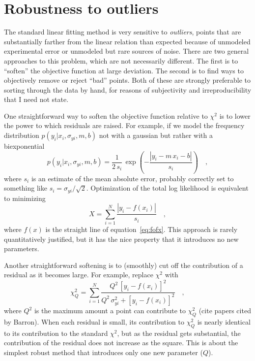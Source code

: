 \documentclass[12pt]{article}
\newcommand{\equationname}{equation}
\newcounter{problem}
\begin{document}
\section{Robustness to outliers}

The standard linear fitting method is very sensitive to
\emph{outliers}, points that are substantially farther from the linear
relation than expected because of unmodeled experimental error or
unmodeled but rare sources of noise.  There are two general approaches
to this problem, which are not necessarily different.  The first is to
``soften'' the objective function at large deviation.  The second is
to find ways to objectively remove or reject ``bad'' points.  Both of
these are strongly preferable to sorting through the data by hand, for
reasons of subjectivity and irreproducibility that I need not state.

One straightforward way to soften the objective function relative to
$\chi^2$ is to lower the power to which residuals are raised.  For
example, if we model the frequency distribution
$p(y_i|x_i,\sigma_{yi},m,b)$ not with a gaussian but rather with a
biexponential
\begin{equation}
p(y_i|x_i,\sigma_{yi},m,b) = \frac{1}{2\,s_i}
 \,\exp\left(-\frac{|y_i-m\,x_i-b|}{s_i}\right) \quad ,
\end{equation}
where $s_i$ is an estimate of the mean absolute error, probably
correctly set to something like $s_i = \sigma_{yi}/\sqrt{2}$.
Optimization of the total log likelihood is equivalent to minimizing
\begin{equation}\label{eq:biexp}
X = \sum_{i=1}^N \frac{|y_i-f(x_i)|}{s_i} \quad ,
\end{equation}
where $f(x)$ is the straight line of \equationname~\ref{eq:fofx}.
This approach is rarely quantitatively justified, but it has the nice
property that it introduces no new parameters.

Another straightforward softening is to (smoothly) cut off the
contribution of a residual as it becomes large.  For example, replace
$\chi^2$ with
\begin{equation}\label{eq:soft}
\chi_Q^2 = \sum_{i=1}^N \frac{Q^2\,[y_i-f(x_i)]^2}
  {Q^2\,\sigma_{yi}^2+[y_i-f(x_i)]^2} \quad ,
\end{equation}
where $Q^2$ is the maximum amount a point can contribute to $\chi_Q^2$
(cite papers cited by Barron).  When each residual is small, its
contribution to $\chi_Q^2$ is nearly identical to its contribution to
the standard $\chi^2$, but as the residual gets substantial, the
contribution of the residual does not increase as the square.  This is
about the simplest robust method that introduces only one new
parameter ($Q$).
\end{document}
